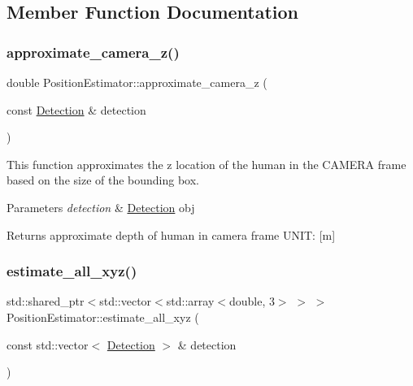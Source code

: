 \subsection{Member Function Documentation}
\mbox{\label{class_position_estimator_a4af8448b844393e6320d3570868f1aaa}} 
\subsubsection{\texorpdfstring{approximate\+\_\+camera\+\_\+z()}{approximate\_camera\_z()}}
{\footnotesize\ttfamily double Position\+Estimator\+::approximate\+\_\+camera\+\_\+z (\begin{DoxyParamCaption}\item[{const \hyperlink{struct_detection}{Detection} \&}]{detection }\end{DoxyParamCaption})}



This function approximates the z location of the human in the C\+A\+M\+E\+RA frame based on the size of the bounding box. 


\begin{DoxyParams}{Parameters}
{\em detection} & \hyperlink{struct_detection}{Detection} obj \\
\hline
\end{DoxyParams}
\begin{DoxyReturn}{Returns}
approximate depth of human in camera frame U\+N\+IT\+: \mbox{[}m\mbox{]} 
\end{DoxyReturn}
\mbox{\label{class_position_estimator_a02dafec98e58e3354ac3abb0a5f53153}} 
\subsubsection{\texorpdfstring{estimate\+\_\+all\+\_\+xyz()}{estimate\_all\_xyz()}}
{\footnotesize\ttfamily std\+::shared\+\_\+ptr$<$std\+::vector$<$std\+::array$<$double, 3$>$ $>$ $>$ Position\+Estimator\+::estimate\+\_\+all\+\_\+xyz (\begin{DoxyParamCaption}\item[{const std\+::vector$<$ \hyperlink{struct_detection}{Detection} $>$ \&}]{detection }\end{DoxyParamCaption})}



